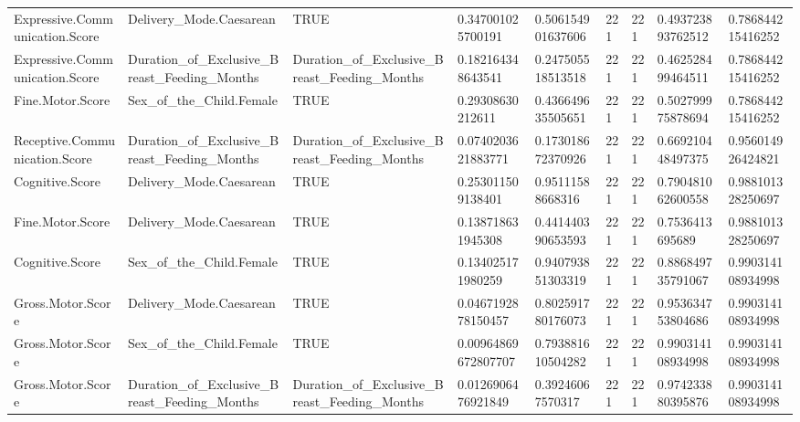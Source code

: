 \begin{longtable}{lllllllll}
Expressive.Communication.Score & Delivery\_Mode.Caesarean & TRUE & 0.347001025700191 & 0.506154901637606 & 221 & 221 & 0.493723893762512 & 0.786844215416252 \\
Expressive.Communication.Score & Duration\_of\_Exclusive\_Breast\_Feeding\_Months & Duration\_of\_Exclusive\_Breast\_Feeding\_Months & 0.182164348643541 & 0.247505518513518 & 221 & 221 & 0.462528499464511 & 0.786844215416252 \\
Fine.Motor.Score & Sex\_of\_the\_Child.Female & TRUE & 0.29308630212611 & 0.436649635505651 & 221 & 221 & 0.502799975878694 & 0.786844215416252 \\
Receptive.Communication.Score & Duration\_of\_Exclusive\_Breast\_Feeding\_Months & Duration\_of\_Exclusive\_Breast\_Feeding\_Months & 0.0740203621883771 & 0.173018672370926 & 221 & 221 & 0.669210448497375 & 0.956014926424821 \\
Cognitive.Score & Delivery\_Mode.Caesarean & TRUE & 0.253011509138401 & 0.95111588668316 & 221 & 221 & 0.790481062600558 & 0.988101328250697 \\
Fine.Motor.Score & Delivery\_Mode.Caesarean & TRUE & 0.138718631945308 & 0.441440390653593 & 221 & 221 & 0.7536413695689 & 0.988101328250697 \\
Cognitive.Score & Sex\_of\_the\_Child.Female & TRUE & 0.134025171980259 & 0.940793851303319 & 221 & 221 & 0.886849735791067 & 0.990314108934998 \\
Gross.Motor.Score & Delivery\_Mode.Caesarean & TRUE & 0.0467192878150457 & 0.802591780176073 & 221 & 221 & 0.953634753804686 & 0.990314108934998 \\
Gross.Motor.Score & Sex\_of\_the\_Child.Female & TRUE & 0.00964869672807707 & 0.793881610504282 & 221 & 221 & 0.990314108934998 & 0.990314108934998 \\
Gross.Motor.Score & Duration\_of\_Exclusive\_Breast\_Feeding\_Months & Duration\_of\_Exclusive\_Breast\_Feeding\_Months & 0.0126906476921849 & 0.39246067570317 & 221 & 221 & 0.974233880395876 & 0.990314108934998 \\
\end{longtable}
